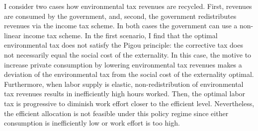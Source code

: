 I consider two cases how environmental tax revenues are recycled. First, revenues are consumed by the government, and, second, the government redistributes revenues via the income tax scheme. In both cases the government can use a non-linear income tax scheme. In the first scenario, I find that the optimal environmental tax does not satisfy the Pigou principle: the corrective tax does not necessarily equal the social cost of the externality. %
In this case, the motive to increase private consumption by lowering environmental tax revenues makes a deviation of the environmental tax from the social cost of the externality optimal.
Furthermore, when labor supply is elastic, non-redistribution of environmental tax revenues results in inefficiently high hours worked. Then, the optimal labor tax is progressive to diminish work effort closer to the efficient level.
Nevertheless, the efficient allocation is not feasible under this policy regime since either consumption is inefficiently low or work effort is too high. 

